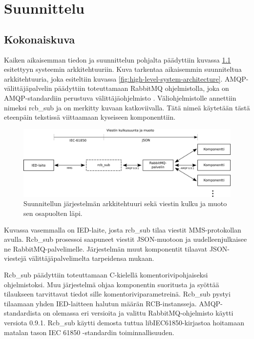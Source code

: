 \chapter{Suunnittelu}
\label{ch:suunnittelu}


\section{Kokonaiskuva}
Kaiken aikaisemman tiedon ja suunnittelun pohjalta päädyttiin kuvassa \ref{fig:planned-system-architecture} esitettyyn systeemin arkkitehtuuriin. Kuva tarkentaa aikaisemmin suunniteltua arkkitehtuuria, joka esiteltiin kuvassa \ref{fig:high-level-system-architecture}. AMQP-välittäjäpalvelin päädyttiin toteuttamaan RabbitMQ ohjelmistolla, joka on AMQP-stan\-dar\-diin perustuva välittäjäohjelmisto \cite{rabbitmq-homepage}. Väliohjelmistolle annettiin nimeksi rcb\_sub ja on merkitty kuvaan katkoviivalla. Tätä nimeä käytetään tästä eteenpäin tekstissä viittaamaan kyseiseen komponenttiin.

\begin{figure}[ht!]
	\includegraphics[width=1\textwidth]{pictures/planned-system-architecture.png}
	\caption{Suunnitellun järjestelmän arkkitehtuuri sekä viestin kulku ja muoto sen osapuolten läpi.}
	\label{fig:planned-system-architecture}
\end{figure}

Kuvassa vasemmalla on IED-laite, josta rcb\_sub tilaa viestit MMS-protokollan avulla. Rcb\_sub prosessoi saapuneet viestit JSON-muotoon ja uudelleenjulkaisee ne RabbitMQ-palvelimelle. Järjestelmän muut komponentit tilaavat JSON-viestejä välittäjäpalvelimelta tarpeidensa mukaan.

Rcb\_sub päädyttiin toteuttamaan C-kielellä komentorivipohjaiseksi ohjelmistoksi. Muu järjestelmä ohjaa komponentin suoritusta ja syöttää tilaukseen tarvittavat tiedot sille komentoriviparametreinä. Rcb\_sub pystyi tilaamaan yhden IED-laitteen halutun määrän RCB-instansseja. AMQP-stan\-dar\-dis\-ta on olemassa eri versioita ja valittu RabbitMQ-ohjelmisto käytti versiota 0.9.1. Rcb\_sub käytti demosta tuttua libIEC61850-kirjastoa hoitamaan matalan tason IEC 61850 -stan\-dar\-din toiminnallisuuden.

